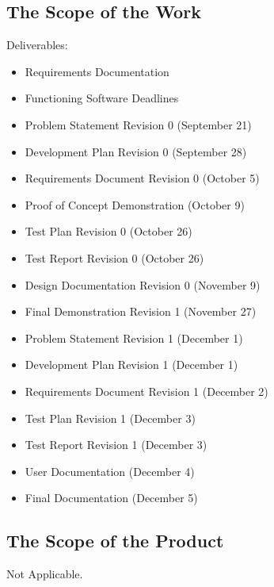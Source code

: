 \documentclass[12pt, titlepage]{article}
\begin{document}
\subsection{The Scope of the Work} \label{deliverables}
Deliverables:
\begin{itemize}
\item Requirements Documentation
\item Functioning Software Deadlines
\item Problem Statement Revision 0  (September 21)
\item Development Plan Revision 0 (September 28)
\item Requirements Document Revision 0 (October 5)
\item Proof of Concept Demonstration (October 9)
\item Test Plan Revision 0 (October 26)
\item Test Report Revision 0 (October 26)
\item Design Documentation Revision 0 (November 9)
\item Final Demonstration Revision 1 (November 27)
\item Problem Statement Revision 1  (December 1)
\item Development Plan Revision 1 (December 1)
\item Requirements Document Revision 1 (December 2)
\item Test Plan Revision 1 (December 3)
\item Test Report Revision 1 (December 3)
\item User Documentation (December 4)
\item Final Documentation (December 5)
\end{itemize}
\subsection{The Scope of the Product}
\hspace{5mm} Not Applicable.
\end{document}
